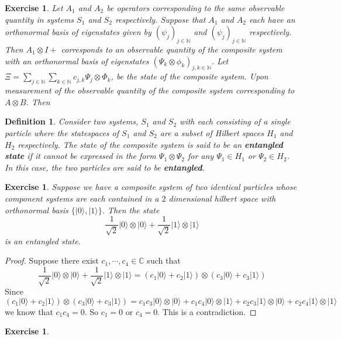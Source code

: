 \documentclass[12pt]{amsart}
\newtheorem{defn}[thm]{Definition}
\newtheorem{ex}[thm]{Exercise}
\renewcommand{\r}{\rangle}
\newcommand{\C}{\mathbb{C}}
\newcommand{\N}{\mathbb{N}}
\begin{document}
	\begin{ex}
		Let $A_1$ and $A_2$ be operators corresponding to the same observable quantity in systems $S_1$ and $S_2$ respectively. Suppose that $A_1$ and $A_2$ each have an orthonormal basis of eigenstates given by $(\psi_{j})_{j \in \N}$ and $(\psi_{j})_{j \in \N}$ respectively. Then $A_1 \otimes I +$ corresponds to an observable quantity of the composite system with an orthonormal basis of eigenstates $(\Psi_{k} \otimes \phi_k)_{j,k \in \N}$. Let $\Xi = \sum\limits_{j \in \N} \sum\limits_{k \in \N} c_{j,k}\Psi_{j} \otimes \Phi_k$, be the state of the composite system. Upon measurement of the observable quantity of the composite system corresponding to $A \otimes B$. Then 
	\end{ex}
	
	\begin{defn}
		Consider two systems, $S_1$ and $S_2$ with each consisting of a single particle where the statespaces of $S_1$ and  $S_2$ are a subset of Hilbert spaces $H_1$ and $H_2$ respectively. The state of the composite system is said to be an \textbf{entangled state} if it cannot be expressed in the form $\Psi_1 \otimes \Psi_2$ for any $\Psi_1 \in H_1$ or $\Psi_2 \in H_2$. In this case, the two particles are said to be \textbf{entangled}.
	\end{defn}
	
	\begin{ex}
		Suppose we have a composite system of two identical particles whose component systems are each contained in a $2$ dimensional hilbert space with orthonormal basis $\{| 0\r, | 1\r\}$. Then the state $$\frac{1}{\sqrt{2}}| 0 \r \otimes | 0 \r + \frac{1}{\sqrt{2}}| 1 \r \otimes | 1 \r$$ is an entangled state.
	\end{ex}
	
	\begin{proof}
		Suppose there exist $c_1, \cdots, c_4 \in \C$ such that $$\frac{1}{\sqrt{2}}| 0 \r \otimes | 0 \r + \frac{1}{\sqrt{2}}| 1 \r \otimes | 1 \r = (c_1 | 0 \r + c_2| 1 \r) \otimes (c_3 | 0 \r + c_3| 1 \r)$$
		Since $$(c_1 | 0 \r + c_2| 1 \r) \otimes (c_3 | 0 \r + c_3| 1 \r) = c_1c_3 | 0 \r \otimes | 0 \r + c_1c_4| 0 \r \otimes | 1 \r + c_2c_3| 1 \r \otimes | 0 \r + c_2c_4| 1 \r \otimes | 1 \r$$ we know that $c_1c_4 =  0$. So $c_1 =0 $ or $c_4 =0$. This is a contradiction.
	\end{proof}
	
	\begin{ex}
		
	\end{ex}
\end{document}
